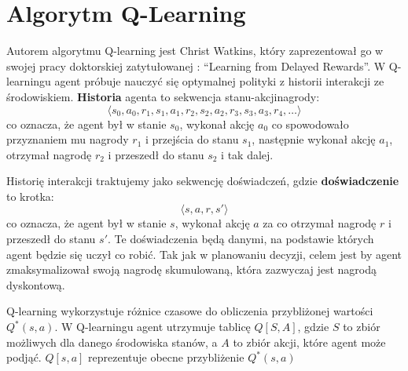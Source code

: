 \documentclass[a4paper, 12pt,oneside]{book}
\begin{document}
\chapter{Algorytm Q-Learning}
\label{chapter:qlearning}
Autorem algorytmu Q-learning jest Christ Watkins, który zaprezentował go w
swojej pracy doktorskiej zatytułowanej : ``Learning from Delayed
Rewards''\cite{qlearning_inventor}.
W Q-learningu agent próbuje nauczyć się optymalnej polityki z historii
interakcji ze środowiskiem. \textbf{Historia} agenta to sekwencja
stanu-akcji\dywiz nagrody:
\[\langle s_0, a_0, r_1, s_1, a_1, r_2, s_2, a_2, r_3, s_3, a_3, r_4, \dots
\rangle\]
co oznacza, że agent był w stanie $s_0$, wykonał akcję $a_0$ co spowodowało
przyznaniem mu nagrody $r_1$ i przejścia do stanu $s_1$, następnie wykonał
akcję $a_1$, otrzymał nagrodę $r_2$ i przeszedł do stanu $s_2$ i tak dalej.

Historię interakcji traktujemy jako sekwencję doświadczeń, gdzie
\textbf{doświadczenie} to krotka:
\[\langle s, a, r, s' \rangle\]
co oznacza, że agent był w stanie $s$, wykonał akcję $a$ za co otrzymał nagrodę
$r$ i przeszedł do stanu $s'$. Te doświadczenia będą danymi, na podstawie
których agent będzie się uczył co robić. Tak jak w planowaniu decyzji, celem
jest by agent zmaksymalizował swoją nagrodę skumulowaną, która zazwyczaj jest
nagrodą dyskontową.

Q-learning wykorzystuje różnice czasowe do obliczenia przybliżonej wartości
$Q^*(s, a)$. W Q-learningu agent utrzymuje tablicę $Q[S,A]$, gdzie $S$ to zbiór
możliwych dla danego środowiska stanów, a $A$ to zbiór akcji, które agent może
podjąć. $Q[s,a]$ reprezentuje obecne przybliżenie $Q^*(s,a)$
\end{document}

